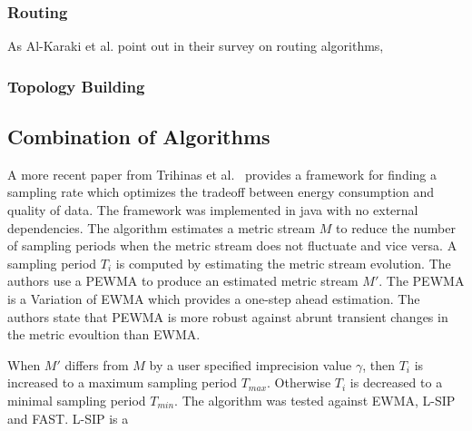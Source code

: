 
\subsubsection{Routing}
\label{sec:Routing}

As Al-Karaki et al. point out in their survey on routing algorithms, 

\subsubsection{Topology Building}
\label{sec:Topology Building}


\subsection{Combination of Algorithms}
\label{sec:Combination of Algorithms}
A more recent paper from Trihinas et al.~\cite{trihinas2015adam} provides a
framework for finding a sampling rate which optimizes the tradeoff between
energy consumption and quality of data. The framework was implemented in java
with no external dependencies. The algorithm estimates a metric stream $ M $
to reduce the number of sampling periods when the metric stream does not
fluctuate and vice versa. A sampling period $ T_i $ is computed by estimating
the metric stream evolution. The authors use a \ac{PEWMA} to produce an
estimated metric stream $ M' $. The \ac{PEWMA} is a Variation of \ac{EWMA}
which provides a one-step ahead estimation. The authors state that \ac{PEWMA}
is more robust against abrunt transient changes in the metric evoultion than
\ac{EWMA}.

When $ M' $ differs from $ M $ by a user specified imprecision value $
\gamma $, then $ T_i $ is increased to a maximum sampling period $ T_{max}
$. Otherwise $ T_i $ is decreased to a minimal sampling period $ T_{min}
$. The algorithm was tested against \ac{EWMA}, L-SIP and FAST. L-SIP is a  



